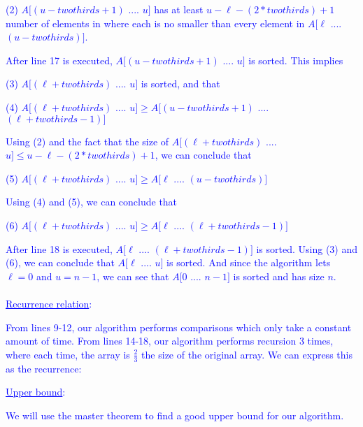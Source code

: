 \documentclass[11pt]{article}
\renewcommand{\blacksquare}{\textcolor{blue}{\openbox}}
\begin{document}
\begin{enumerate}
\textcolor{blue}{ (2) $A[(u - twothirds + 1)$ .... $u]$ has at least $u - \ell - (2*twothirds) + 1$ number of elements in where each is no smaller than every element in $A[\ell$ .... $(u - twothirds)]$.}

\textcolor{blue}{ After line 17 is executed, $A[(u - twothirds + 1)$ .... $u]$ is sorted. This implies}

\textcolor{blue}{ (3) $A[(\ell + twothirds)$ .... $u]$ is sorted, and that}

\textcolor{blue}{ (4) $A[(\ell + twothirds)$ .... $u] \geq A[(u - twothirds + 1)$ .... $(\ell + twothirds - 1)]$}

\textcolor{blue}{ Using (2) and the fact that the size of $A[(\ell + twothirds)$ .... $u] \leq u - \ell - (2*twothirds) + 1$, we can conclude that}

\textcolor{blue}{ (5) $A[(\ell + twothirds)$ .... $u] \geq A[\ell$ .... $(u - twothirds)]$} 

\textcolor{blue}{ Using (4) and (5), we can conclude that}

\textcolor{blue}{ (6) $A[(\ell + twothirds)$ .... $u] \geq A[\ell$ .... $(\ell + twothirds - 1)]$}

\textcolor{blue}{ After line 18 is executed, $A[\ell$ .... $(\ell + twothirds - 1)]$ is sorted. Using (3) and (6), we can conclude that $A[\ell$ .... $u]$ is sorted. And since the algorithm lets $\ell = 0$ and $u = n - 1$, we can see that $A[0$ .... $n - 1]$ is sorted and has size $n$.}\-\hspace{12cm}\blacksquare\\
\- \\
\textcolor{blue}{ \underline{Recurrence relation}:}

\textcolor{blue}{ From lines 9-12, our algorithm performs comparisons which only take a constant amount of time. From lines 14-18, our algorithm performs recursion 3 times, where each time, the array is $\frac{2}{3}$ the size of the original array. We can express this as the recurrence:}
\textcolor{blue}{\begin{center}\end{center}}

\textcolor{blue}{ \underline{Upper bound}:}

\textcolor{blue}{ We will use the master theorem to find a good upper bound for our algorithm.}


\end{enumerate}
\end{document}
